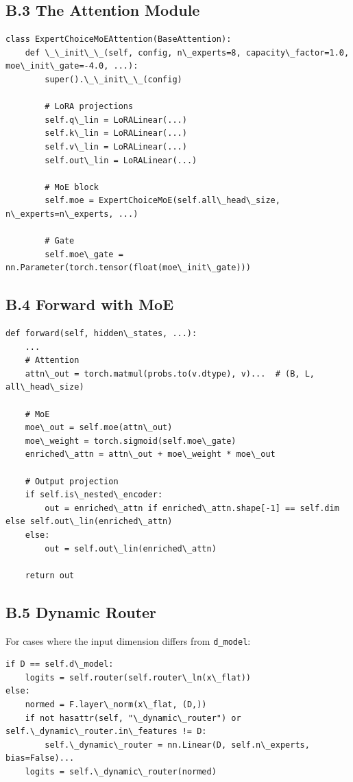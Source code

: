 \subsection{B.3 The Attention Module}

\begin{lstlisting}
class ExpertChoiceMoEAttention(BaseAttention):
    def \_\_init\_\_(self, config, n\_experts=8, capacity\_factor=1.0, moe\_init\_gate=-4.0, ...):
        super().\_\_init\_\_(config)
        
        # LoRA projections
        self.q\_lin = LoRALinear(...)
        self.k\_lin = LoRALinear(...)
        self.v\_lin = LoRALinear(...)
        self.out\_lin = LoRALinear(...)
        
        # MoE block
        self.moe = ExpertChoiceMoE(self.all\_head\_size, n\_experts=n\_experts, ...)
        
        # Gate
        self.moe\_gate = nn.Parameter(torch.tensor(float(moe\_init\_gate)))
\end{lstlisting}

\subsection{B.4 Forward with MoE}

\begin{lstlisting}
def forward(self, hidden\_states, ...):
    ...
    # Attention
    attn\_out = torch.matmul(probs.to(v.dtype), v)...  # (B, L, all\_head\_size)
    
    # MoE
    moe\_out = self.moe(attn\_out)
    moe\_weight = torch.sigmoid(self.moe\_gate)
    enriched\_attn = attn\_out + moe\_weight * moe\_out
    
    # Output projection
    if self.is\_nested\_encoder:
        out = enriched\_attn if enriched\_attn.shape[-1] == self.dim else self.out\_lin(enriched\_attn)
    else:
        out = self.out\_lin(enriched\_attn)
    
    return out
\end{lstlisting}

\subsection{B.5 Dynamic Router}

For cases where the input dimension differs from \texttt{d\_model}:

\begin{lstlisting}
if D == self.d\_model:
    logits = self.router(self.router\_ln(x\_flat))
else:
    normed = F.layer\_norm(x\_flat, (D,))
    if not hasattr(self, "\_dynamic\_router") or self.\_dynamic\_router.in\_features != D:
        self.\_dynamic\_router = nn.Linear(D, self.n\_experts, bias=False)...
    logits = self.\_dynamic\_router(normed)
\end{lstlisting}

